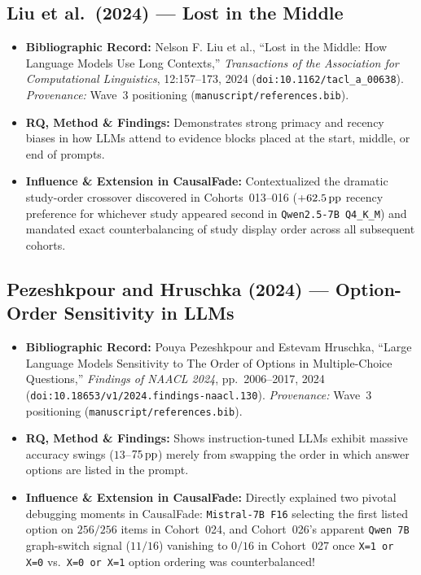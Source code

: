 \subsection{Liu et al.\ (2024) --- Lost in the Middle \citep{liu2024lost}}
\begin{itemize}
  \item \textbf{Bibliographic Record:} Nelson F. Liu et al., ``Lost in the Middle: How Language Models Use Long Contexts,'' \emph{Transactions of the Association for Computational Linguistics}, 12:157--173, 2024 (\texttt{doi:10.1162/tacl\_a\_00638}). \emph{Provenance:} Wave~3 positioning (\texttt{manuscript/references.bib}).
  \item \textbf{RQ, Method \& Findings:} Demonstrates strong primacy and recency biases in how LLMs attend to evidence blocks placed at the start, middle, or end of prompts.
  \item \textbf{Influence \& Extension in CausalFade:} Contextualized the dramatic study-order crossover discovered in Cohorts~013--016 ($+62.5\,\mathrm{pp}$ recency preference for whichever study appeared second in \texttt{Qwen2.5-7B Q4\_K\_M}) and mandated exact counterbalancing of study display order across all subsequent cohorts.
\end{itemize}

\subsection{Pezeshkpour and Hruschka (2024) --- Option-Order Sensitivity in LLMs \citep{pezeshkpour2024order}}
\begin{itemize}
  \item \textbf{Bibliographic Record:} Pouya Pezeshkpour and Estevam Hruschka, ``Large Language Models Sensitivity to The Order of Options in Multiple-Choice Questions,'' \emph{Findings of NAACL 2024}, pp.~2006--2017, 2024 (\texttt{doi:10.18653/v1/2024.findings-naacl.130}). \emph{Provenance:} Wave~3 positioning (\texttt{manuscript/references.bib}).
  \item \textbf{RQ, Method \& Findings:} Shows instruction-tuned LLMs exhibit massive accuracy swings ($13$--$75\,\mathrm{pp}$) merely from swapping the order in which answer options are listed in the prompt.
  \item \textbf{Influence \& Extension in CausalFade:} Directly explained two pivotal debugging moments in CausalFade: \texttt{Mistral-7B F16} selecting the first listed option on $256/256$ items in Cohort~024, and Cohort~026's apparent \texttt{Qwen 7B} graph-switch signal ($11/16$) vanishing to $0/16$ in Cohort~027 once \texttt{X=1 or X=0} vs.\ \texttt{X=0 or X=1} option ordering was counterbalanced!
\end{itemize}

